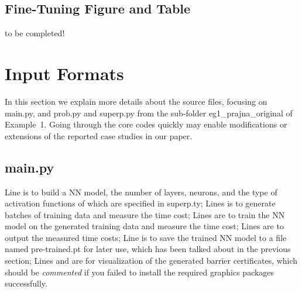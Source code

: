 \documentclass{llncs}
\begin{document}
\subsection{Fine-Tuning Figure and Table}
to be completed!

\section{Input Formats}

In this section we explain more details about the source files, focusing on \textsf{main.py}, and \textsf{prob.py} and \textsf{superp.py} from the sub-folder
{\color{blue}\textsf{eg1\_prajna\_original}} of Example~1. Going through the core codes quickly may enable modifications or extensions of
the reported case studies in our paper.

\subsection{\textsf{main.py}}
Line 
is to build a NN model, the number of layers, neurons, and the type of activation functions of which are specified in \textsf{superp.ty};
Lines
is to generate batches of training data and measure the time cost; 
Lines
are to train the NN model on the generated training data and measure the time cost;
Lines
are to output the measured time costs; 
Line
is to save the trained NN model to a file named \textsf{pre-trained.pt} for later use, which has been talked about in the previous section;
Lines
and
are for visualization of the generated barrier certificates, which should be \emph{commented} if you
failed to install the required graphics packages successfully.
\end{document}
